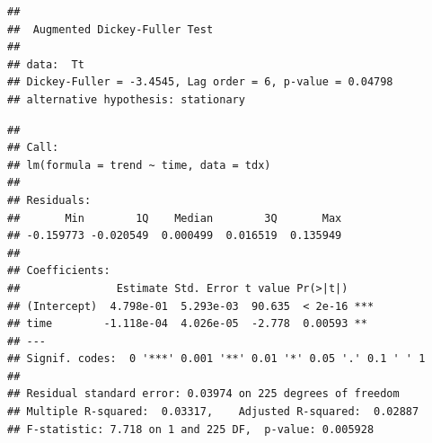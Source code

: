\documentclass[10pt]{report}
\newenvironment{Shaded}{\begin{snugshade}}{\end{snugshade}}
\newcommand{\AttributeTok}[1]{\textcolor[rgb]{0.77,0.63,0.00}{#1}}
\newcommand{\DecValTok}[1]{\textcolor[rgb]{0.00,0.00,0.81}{#1}}
\newcommand{\FunctionTok}[1]{\textcolor[rgb]{0.00,0.00,0.00}{#1}}
\newcommand{\NormalTok}[1]{#1}
\newcommand{\OtherTok}[1]{\textcolor[rgb]{0.56,0.35,0.01}{#1}}
\newcommand{\SpecialCharTok}[1]{\textcolor[rgb]{0.00,0.00,0.00}{#1}}
\newcommand{\StringTok}[1]{\textcolor[rgb]{0.31,0.60,0.02}{#1}}
\begin{document}
\begin{verbatim}
## 
##  Augmented Dickey-Fuller Test
## 
## data:  Tt
## Dickey-Fuller = -3.4545, Lag order = 6, p-value = 0.04798
## alternative hypothesis: stationary
\end{verbatim}

\begin{Shaded}
\end{Shaded}

\begin{verbatim}
## 
## Call:
## lm(formula = trend ~ time, data = tdx)
## 
## Residuals:
##       Min        1Q    Median        3Q       Max 
## -0.159773 -0.020549  0.000499  0.016519  0.135949 
## 
## Coefficients:
##               Estimate Std. Error t value Pr(>|t|)    
## (Intercept)  4.798e-01  5.293e-03  90.635  < 2e-16 ***
## time        -1.118e-04  4.026e-05  -2.778  0.00593 ** 
## ---
## Signif. codes:  0 '***' 0.001 '**' 0.01 '*' 0.05 '.' 0.1 ' ' 1
## 
## Residual standard error: 0.03974 on 225 degrees of freedom
## Multiple R-squared:  0.03317,    Adjusted R-squared:  0.02887 
## F-statistic: 7.718 on 1 and 225 DF,  p-value: 0.005928
\end{verbatim}

\begin{Shaded}
\end{Shaded}
\end{document}
